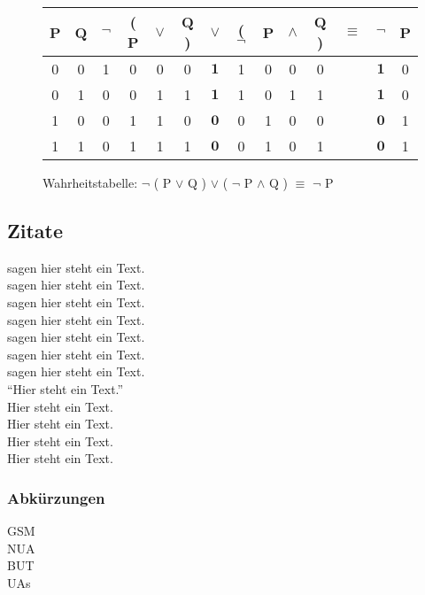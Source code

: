 \begin{figure}[!ht]
  \begin{center}
    \begin{tabular}{|c|c||c|c|c|c|c|c|c|c|c||c||c|c|}
    \hline
    P & Q & $\neg$ & ( P & $\vee$ & Q ) & $\vee$ & ( $\neg$ & P & $\wedge$ & Q ) & $\equiv$ & $\neg$ & P  \\ \hline \hline
    0 & 0 & 1 & 0 & 0 & 0 & $\mathbf{1}$ & 1 & 0 & 0 & 0 & & $\mathbf{1}$ & 0\\ \hline
    0 & 1 & 0 & 0 & 1 & 1 & $\mathbf{1}$ & 1 & 0 & 1 & 1 & & $\mathbf{1}$ & 0\\ \hline
    1 & 0 & 0 & 1 & 1 & 0 & $\mathbf{0}$ & 0 & 1 & 0 & 0 & & $\mathbf{0}$ & 1\\ \hline
    1 & 1 & 0 & 1 & 1 & 1 & $\mathbf{0}$ & 0 & 1 & 0 & 1 & & $\mathbf{0}$ & 1\\ \hline
    \end{tabular}
    \caption{Wahrheitstabelle: $\neg$ ( P $\vee$ Q ) $\vee$ ( $\neg$ P $\wedge$ Q ) $\equiv$ $\neg$ P}
  \end{center}
\end{figure}

\subsection{Zitate}
\cite{Google13} sagen hier steht ein Text. \\
\citet{Hidayat13} sagen hier steht ein Text. \\
\citet*{Yahoo13} sagen hier steht ein Text. \\
\citet*{Trostler13} sagen hier steht ein Text. \\
\citet*{Wiki13-01} sagen hier steht ein Text. \\
\citet*{Wiki13-02} sagen hier steht ein Text. \\
\citet*{Wiki13-03} sagen hier steht ein Text. \\
"`Hier steht ein Text."' \citep{Johansen10} \\
Hier steht ein Text. \citep[Vgl.][]{Kleivane11} \\
Hier steht ein Text. \citep[][S. 200]{Koch01} \\
Hier steht ein Text. \citep*[][S. 200]{Pivotal13} \\
Hier steht ein Text. \citep{Selenium13,Nguyen13} \\


\subsubsection{Abkürzungen}
\acf{GSM} \\
\acs{NUA} \\
\acl{BUT}  \\
\acp{UA} \\


